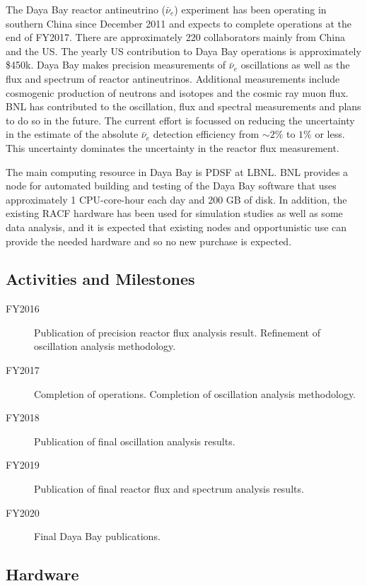 \documentclass[pdftex,12pt,letter]{article}
\begin{document}
The Daya Bay reactor antineutrino ($\bar\nu_e$) experiment has been
operating in southern China since December 2011 and expects to
complete operations at the end of FY2017. There are approximately 220
collaborators mainly from China and the US. The yearly US contribution
to Daya Bay operations is approximately \$450k.
Daya Bay makes precision measurements of $\bar\nu_e$ oscillations as
well as the flux and spectrum of reactor antineutrinos. 
Additional measurements include cosmogenic production of neutrons and
isotopes and the cosmic ray muon flux. 
BNL has contributed to the oscillation, flux and spectral measurements
and plans to do so in the future. The current effort is focussed on
reducing the uncertainty in the estimate of the absolute $\bar\nu_e$
detection efficiency from $\sim\!2\%$ to $1\%$ or less. This
uncertainty dominates the uncertainty in the reactor flux measurement. 

The main computing resource in Daya Bay is PDSF at LBNL. BNL provides
a node for automated building and testing of the Daya Bay software
that uses approximately 1 CPU-core-hour each day and 200 GB of disk.
In addition, the existing RACF hardware has been used for simulation
studies as well as some data analysis, and 
it is expected that existing nodes and opportunistic use can provide
the needed hardware and so no new purchase is expected.


\subsection{Activities and Milestones}

\begin{description}
\item[FY2016] Publication of precision reactor flux analysis result. 
				Refinement of oscillation analysis methodology. 
\item[FY2017] Completion of operations. Completion of oscillation analysis methodology. 
\item[FY2018] Publication of final oscillation analysis results.
\item[FY2019] Publication of final reactor flux and spectrum analysis results.
\item[FY2020] Final Daya Bay publications.
\end{description}

\subsection{Hardware}
\end{document}
